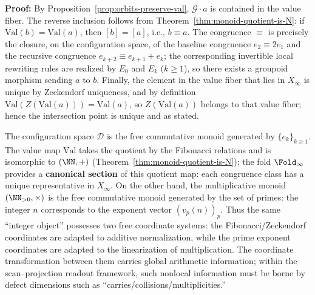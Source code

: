 \textbf{Proof:}
By Proposition~\ref{prop:orbits-preserve-val}, $\mathcal{G}\cdot a$ is contained in the value fiber. The reverse inclusion follows from Theorem~\ref{thm:monoid-quotient-is-N}: if $\mathrm{Val}(b)=\mathrm{Val}(a)$, then $[b]=[a]$, i.e., $b\equiv a$. The congruence $\equiv$ is precisely the closure, on the configuration space, of the baseline congruence $e_2\equiv 2e_1$ and the recursive congruence $e_{k+2}\equiv e_{k+1}+e_k$; the corresponding invertible local rewriting rules are realized by $E_0$ and $E_k$ ($k\ge 1$), so there exists a groupoid morphism sending $a$ to $b$. Finally, the element in the value fiber that lies in $X_\infty$ is unique by Zeckendorf uniqueness, and by definition $\mathrm{Val}(Z(\mathrm{Val}(a)))=\mathrm{Val}(a)$, so $Z(\mathrm{Val}(a))$ belongs to that value fiber; hence the intersection point is unique and as stated.

\begin{remark}\label{rem:two-coordinate-monoids}
The configuration space $\mathcal{D}$ is the free commutative monoid generated by $\{e_k\}_{k\ge 1}$. The value map $\mathrm{Val}$ takes the quotient by the Fibonacci relations and is isomorphic to $(\NN,+)$ (Theorem~\ref{thm:monoid-quotient-is-N}); the fold $\Fold_\infty$ provides a \textbf{canonical section} of this quotient map: each congruence class has a unique representative in $X_\infty$.
On the other hand, the multiplicative monoid $(\NN_{>0},\times)$ is the free commutative monoid generated by the set of primes: the integer $n$ corresponds to the exponent vector $(v_p(n))_p$. Thus the same ``integer object'' possesses two free coordinate systems: the Fibonacci/Zeckendorf coordinates are adapted to additive normalization, while the prime exponent coordinates are adapted to the linearization of multiplication. The coordinate transformation between them carries global arithmetic information; within the scan--projection readout framework, such nonlocal information must be borne by defect dimensions such as ``carries/collisions/multiplicities.''
\end{remark}

